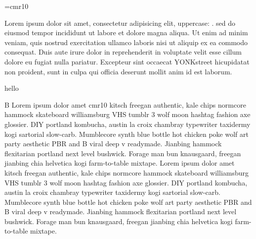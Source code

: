 \font\thefont=cmr10 \selectfont

\relax


\noindent

\indent Lorem ipsum dolor sit amet, consectetur adipisicing elit, uppercase:  \def\yo{\relax} \uppercase \relax \relax\relax\yo  {hello world} \hskip 10pt. sed do eiusmod tempor incididunt ut labore et dolore magna aliqua. Ut enim ad minim veniam, quis nostrud exercitation ullamco laboris nisi ut aliquip ex ea commodo consequat. Duis aute irure dolor in reprehenderit \ignorespaces        in voluptate velit esse cillum dolore eu fugiat nulla pariatur. Excepteur sint occaecat \def\hi{YONK} \hi street \csname hi\endcsname cupidatat non proident, sunt in culpa qui officia deserunt mollit anim id est laborum.

\def\param#1{hello}

\param

\ignorespaces       










\noindent B \relax Lorem ipsum \indent dolor \noindent amet \font\thefont cmr10 \selectfont kitsch freegan  authentic, kale chips normcore hammock skateboard williamsburg VHS tumblr 3 wolf moon hashtag fashion axe glossier. DIY portland kombucha, austin la croix chambray typewriter taxidermy kogi sartorial slow-carb. Mumblecore synth blue bottle hot chicken poke wolf art party aesthetic PBR and B viral deep v readymade. Jianbing hammock flexitarian portland next level bushwick. Forage man bun knausgaard, freegan jianbing chia helvetica kogi farm-to-table mixtape. Lorem ipsum dolor amet kitsch freegan authentic, kale chips normcore hammock skateboard williamsburg VHS tumblr 3 wolf moon hashtag fashion axe glossier. DIY portland kombucha, austin la croix chambray typewriter taxidermy kogi sartorial slow-carb. Mumblecore synth blue bottle hot chicken poke wolf art party aesthetic PBR and B viral deep v readymade. Jianbing hammock flexitarian portland next level bushwick. Forage man bun knausgaard, freegan jianbing chia helvetica kogi farm-to-table mixtape.

